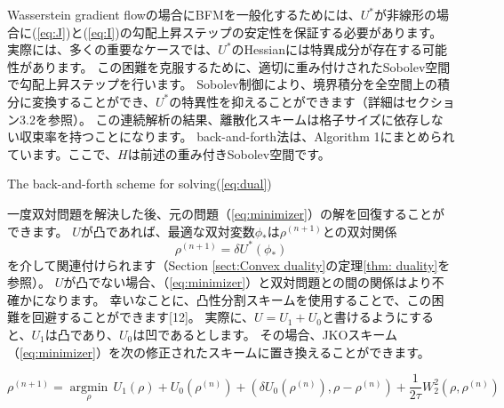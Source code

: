 \documentclass{jsarticle}
\theoremstyle{definition}
\begin{document}
Wasserstein gradient flowの場合にBFMを一般化するためには、$U^*$が非線形の場合に(\ref{eq:J})と(\ref{eq:I})の勾配上昇ステップの安定性を保証する必要があります。
実際には、多くの重要なケースでは、$U^*$のHessianには特異成分が存在する可能性があります。
この困難を克服するために、適切に重み付けされたSobolev空間で勾配上昇ステップを行います。
Sobolev制御により、境界積分を全空間上の積分に変換することができ、$U^*$の特異性を抑えることができます（詳細はセクション3.2を参照）。
この連続解析の結果、離散化スキームは格子サイズに依存しない収束率を持つことになります。
back-and-forth法は、Algorithm 1にまとめられています。ここで、$H$は前述の重み付きSobolev空間です。\\

\begin{algorithm}[tb]
    \caption{The back-and-forth scheme for solving(\ref{eq:dual})}
    \begin{algorithmic}
    \end{algorithmic}
\end{algorithm}

一度双対問題を解決した後、元の問題（\ref{eq:minimizer}）の解を回復することができます。
$U$が凸であれば、最適な双対変数$\phi_*$は$\rho^{(n+1)}$との双対関係
{\color{red}
$$
    \rho^{(n+1)} = \delta U^*(\phi_*)
$$
}
を介して関連付けられます（Section \ref{sect:Convex duality}の定理\ref{thm: duality}を参照）。
$U$が凸でない場合、（\ref{eq:minimizer}）と双対問題との間の関係はより不確かになります。
幸いなことに、凸性分割スキームを使用することで、この困難を回避することができます[12]。
実際に、$U = U_1 + U_0$と書けるようにすると、$U_1$は凸であり、$U_0$は凹であるとします。
その場合、JKOスキーム（\ref{eq:minimizer}）を次の修正されたスキームに置き換えることができます。

\begin{equation}
    \label{eq:JKO}
    \rho^{(n+1)} = \underset{\rho}{\operatorname{argmin}} \, U_1(\rho) + U_0(\rho^{(n)}) + (\delta U_0(\rho^{(n)}), \rho - \rho^{(n)}) + \frac{1}{2 \tau} W^2_2(\rho, \rho^{(n)})
\end{equation}
\end{document}
